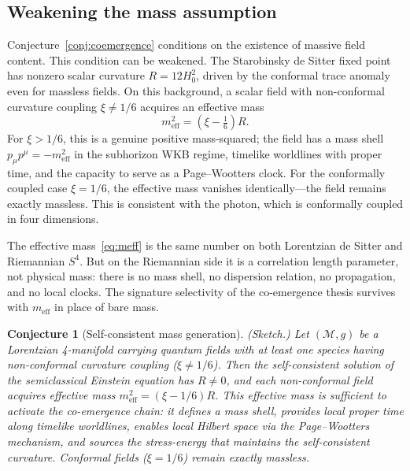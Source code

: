 \documentclass[12pt,a4paper]{article}
\newtheorem{conjecture}{Conjecture}
\theoremstyle{definition}
\theoremstyle{remark}
\begin{document}
\subsection{Weakening the mass assumption}
\label{sec:mass_generation}

Conjecture~\ref{conj:coemergence} conditions on the existence of massive
field content. This condition can be weakened. The Starobinsky de Sitter
fixed point~\cite{starobinsky} has nonzero scalar curvature
$R = 12H_0^2$, driven by the conformal trace anomaly even for massless
fields. On this background, a scalar field with non-conformal curvature
coupling $\xi \neq 1/6$ acquires an effective mass
\begin{equation}
m_{\mathrm{eff}}^2 = \left(\xi - \tfrac{1}{6}\right) R.
\label{eq:meff}
\end{equation}
For $\xi > 1/6$, this is a genuine positive mass-squared; the field has
a mass shell $p_\mu p^\mu = -m_{\mathrm{eff}}^2$ in the subhorizon WKB
regime, timelike worldlines with proper time, and the capacity to serve
as a Page--Wootters clock. For the conformally coupled case $\xi = 1/6$,
the effective mass vanishes identically---the field remains exactly
massless. This is consistent with the photon, which is conformally
coupled in four dimensions.

The effective mass~\eqref{eq:meff} is the same number on both Lorentzian
de Sitter and Riemannian $S^4$. But on the Riemannian side it is a
correlation length parameter, not physical mass: there is no mass shell,
no dispersion relation, no propagation, and no local clocks. The
signature selectivity of the co-emergence thesis survives with
$m_{\mathrm{eff}}$ in place of bare mass.

\begin{conjecture}[Self-consistent mass generation]
\label{conj:mass_generation}
\emph{(Sketch.)}
Let $(\mathcal{M}, g)$ be a Lorentzian 4-manifold carrying quantum
fields with at least one species having non-conformal curvature coupling
($\xi \neq 1/6$). Then the self-consistent solution of the semiclassical
Einstein equation has $R \neq 0$, and each non-conformal field acquires
effective mass $m_{\mathrm{eff}}^2 = (\xi - 1/6)R$. This effective mass
is sufficient to activate the co-emergence chain: it defines a mass
shell, provides local proper time along timelike worldlines, enables
local Hilbert space via the Page--Wootters mechanism, and sources the
stress-energy that maintains the self-consistent curvature. Conformal
fields ($\xi = 1/6$) remain exactly massless.
\end{conjecture}
\end{document}
